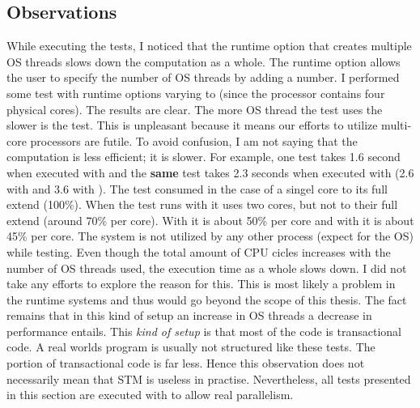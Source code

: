 \subsection{Observations}
While executing the tests, I noticed that the runtime option  that creates multiple OS threads slows down the 
computation as a whole. The runtime option  allows the user to specify the number of OS threads by adding a 
number. I performed some test with runtime options varying  to  (since the processor contains four 
physical cores). The results are clear. The more OS thread the test uses the slower is the test. This is unpleasant 
because it means our efforts to utilize multi-core processors are futile. To avoid confusion, I am not saying that 
the computation is less efficient; it is slower. For example, one test takes 1.6 second when executed with 
and the \textbf{same} test takes 2.3 seconds when executed with  (2.6 with  and 3.6 with ).
The test consumed in the case of  a singel core to its full extend (100\%). When the test runs with 
it uses two cores, but not to their full extend (around 70\% per core). With  it is about 50\% per core and 
with  it is about 45\% per core. The system is not utilized by any other process (expect for the OS) while
testing. Even though the total amount of CPU cicles increases with the number of OS threads used, the execution time 
as a whole slows down. I did not take any efforts to explore the reason for this. This is most likely a problem 
in the runtime systems and thus would go beyond the scope of this thesis. The fact remains that in this kind of
setup an increase in OS threads a decrease in performance entails. This \textit{kind of setup} is that most of 
the code is transactional code. A real worlds program is usually not structured like these tests. The portion
of transactional code is far less. Hence this observation does not necessarily mean that STM is useless in 
practise. Nevertheless, all tests presented in this section are executed with  to allow real parallelism. 


